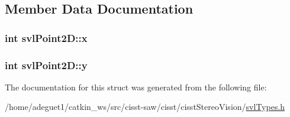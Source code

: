 \subsection{Member Data Documentation}
\hypertarget{structsvl_point2_d_a6993df11112bf2ed7acaf97215988ba7}{
\subsubsection[{x}]{\setlength{\rightskip}{0pt plus 5cm}int svl\-Point2\-D\-::x}}\label{structsvl_point2_d_a6993df11112bf2ed7acaf97215988ba7}
\hypertarget{structsvl_point2_d_a64c9c29fe5dda7ff0e2c956fc227e6c9}{
\subsubsection[{y}]{\setlength{\rightskip}{0pt plus 5cm}int svl\-Point2\-D\-::y}}\label{structsvl_point2_d_a64c9c29fe5dda7ff0e2c956fc227e6c9}


The documentation for this struct was generated from the following file\-:\begin{DoxyCompactItemize}
\item 
/home/adeguet1/catkin\-\_\-ws/src/cisst-\/saw/cisst/cisst\-Stereo\-Vision/\hyperlink{svl_types_8h}{svl\-Types.\-h}\end{DoxyCompactItemize}

